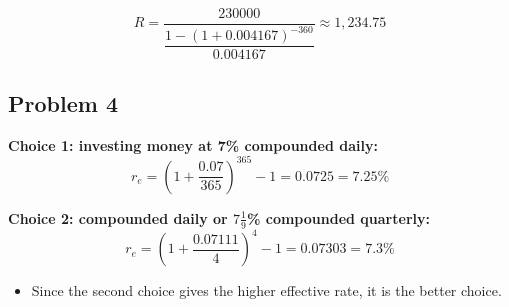 \documentclass[12pt]{article}
\begin{document}
\[
R = \dfrac{230000}{\dfrac{1 - (1 + 0.004167)^{-360}}{0.004167}} \approx \boxed{1{,}234.75}
\]

\subsection*{Problem 4}
\textbf{Choice 1: investing money at 7\% compounded daily:}
\[
r_e = \left(1 + \dfrac{0.07}{365} \right)^{365} - 1 = 0.0725 = \boxed{7.25\%}
\]

\textbf{Choice 2: compounded daily or \( 7 \tfrac{1}{9} \)\% compounded quarterly:}
\[
r_e = \left(1 + \dfrac{0.07111}{4} \right)^4 - 1 = 0.07303 = \boxed{7.3\%}
\]

\begin{itemize}
    \item Since the second choice gives the higher effective rate, it is the better choice.
\end{itemize}
\end{document}
